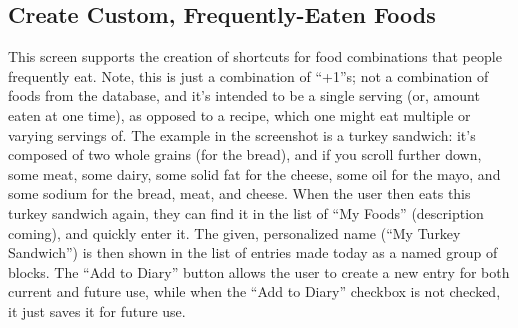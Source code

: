 \subsection{Create Custom, Frequently-Eaten Foods}
This screen supports the creation of shortcuts for food combinations that people frequently eat. Note, this is just a combination of ``+1''s; not a combination of foods from the database, and it's intended to be a single serving (or, amount eaten at one time), as opposed to a recipe, which one might eat multiple or varying servings of. The example in the screenshot is a turkey sandwich: it's composed of two whole grains (for the bread), and if you scroll further down, some meat, some dairy, some solid fat for the cheese, some oil for the mayo, and some sodium for the bread, meat, and cheese. When the user then eats this turkey sandwich again, they can find it in the list of ``My Foods'' (description coming), and quickly enter it. The given, personalized name (``My Turkey Sandwich'') is then shown in the list of entries made today as a named group of blocks. The ``Add to Diary'' button allows the user to create a new entry for both current and future use, while when the ``Add to Diary'' checkbox is not checked, it just saves it for future use. 

